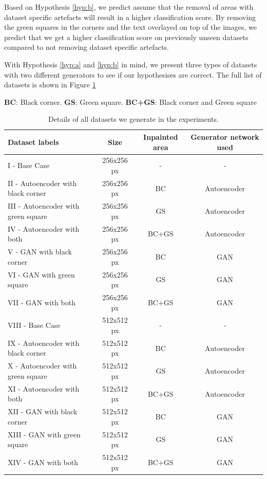 Based on Hypothesis \ref{hyp:b}, we predict assume that the removal of areas with dataset specific artefacts will result in a higher classification score.  By removing the green squares in the corners and the text overlayed on top of the images, we predict that we get a higher classification score on previously unseen datasets compared to not removing dataset specific artefacts.


With Hypothesis \ref{hyp:a} and \ref{hyp:b} in mind, we present three types of datasets with two different generators to see if our hypothesises are correct. The full list of datasets is shown in Figure \ref{tab:datasets}




\begin{table}[h]
\centering
\footnotesize
\caption*{\small \textbf{BC}: Black corner. \textbf{GS}: Green square. \textbf{BC+GS}: Black corner and Green square}
\begin{tabular}{lccc}
\toprule
{Dataset labels} & {Size} & {Inpainted area} & {Generator network used} \\ 
\midrule
I    - Base Case                       & 256x256 px         & -        & -                   \\
II   - Autoencoder with black corner   & 256x256 px         & BC       & Autoencoder         \\
III  - Autoencoder with green square   & 256x256 px         & GS       & Autoencoder         \\
IV   - Autoencoder with both           & 256x256 px         & BC+GS    & Autoencoder         \\
V    - GAN with black corner           & 256x256 px         & BC       & GAN                 \\
VI   - GAN with green square   		   & 256x256 px         & GS       & GAN                 \\
VII  - GAN with both                   & 256x256 px         & BC+GS    & GAN                 \\
VIII - Base Case					   & 512x512 px         & -        & -                   \\
IX - Autoencoder with black corner     & 512x512 px         & BC       & Autoencoder         \\
X - Autoencoder with green square      & 512x512 px         & GS       & Autoencoder         \\
XI - Autoencoder with both   		   & 512x512 px         & BC+GS    & Autoencoder         \\
XII - GAN with black corner            & 512x512 px         & BC       & GAN                 \\
XIII - GAN with green square           & 512x512 px         & GS       & GAN                 \\
XIV - GAN with both           	  	   & 512x512 px         & BC+GS    & GAN                 \\
\bottomrule
\end{tabular}%
\caption{Details of all datasets we generate in the experiments.} 
\label{tab:datasets}
\end{table}

